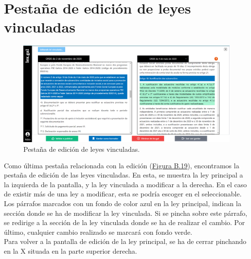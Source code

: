 \section{Pestaña de edición de leyes vinculadas}
\label{PEdicionLeyVinculada}

\begin{figure}[H]
\centerline{\includegraphics[width=15cm]{figuras/manualUsuario/PestanaLeyVinculada.PNG}}
\caption{Pestaña de edición de leyes vinculadas.}
\label{enlacePLeyVinculada}
\end{figure}

Como última pestaña relacionada con la edición (\hyperref[enlacePLeyVinculada]{Figura B.19}), encontramos la pestaña de edición de las leyes vinculadas. En esta, se muestra la ley principal a la izquierda de la pantalla, y la ley vinculada a modificar a la derecha. En el caso de existir más de una ley a modificar, esta se podría escoger en el seleccionable.
\\

Los párrafos marcados con un fondo de color azul en la ley principal, indican la sección donde se ha de modificar la ley vinculada. Si se pincha sobre este párrafo, se redirige a la sección de la ley vinculada donde se ha de realizar el cambio. Por último, cualquier cambio realizado se marcará con fondo verde. 
\\

Para volver a la pantalla de edición de la ley principal, se ha de cerrar pinchando en la X situada en la parte superior derecha.